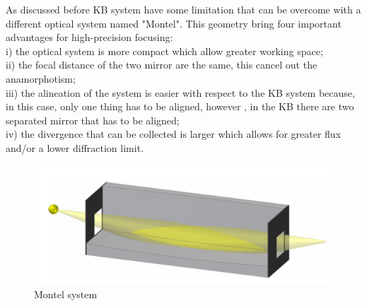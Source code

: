 \hspace{10mm} As discussed before KB system have some limitation that can be overcome with a different optical system named "Montel". This geometry bring four important advantages for high-precision focusing: 
\\ i) the optical system is more compact which allow greater working space;
\\ ii) the focal distance of the two mirror are the same, this cancel out  the anamorphotism;
\\ iii) the alineation of the system is easier with respect to the KB system because, in this case, only one thing has to be aligned, however , in the KB there are two separated mirror that has to be aligned;
\\ iv) the divergence that can be collected is larger which allows for greater flux and/or a lower diffraction limit.
\begin{figure}[H]
%
\centering
%
\includegraphics[width=.6\textwidth]{Immagini/Chapter2/MontelSystem}
%
\caption{Montel system}
%
\label{fig: SurfaceConic1}
%
\end{figure}

